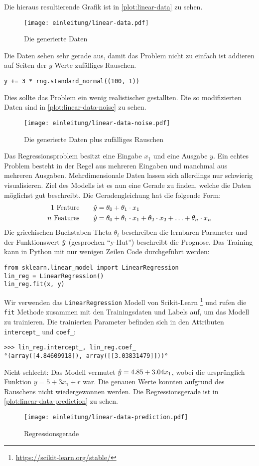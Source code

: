Die hieraus resultierende Grafik ist in \autoref{plot:linear-data} zu sehen.
\newpage
\begin{figure}
  \centering
  \texttt{[image: einleitung/linear-data.pdf]}
  \caption{Die generierte Daten}
  \label{plot:linear-data}
\end{figure}
\noindent
Die Daten sehen sehr gerade aus, damit das Problem nicht zu einfach ist
addieren auf Seiten der $y$ Werte zufälliges Rauschen.
\begin{lstlisting}
y += 3 * rng.standard_normal((100, 1))
\end{lstlisting}
Dies sollte das Problem ein wenig realistischer gestallten.
Die so modifizierten Daten sind in \autoref{plot:linear-data-noise} zu sehen.
\begin{figure}[h]
  \centering
  \texttt{[image: einleitung/linear-data-noise.pdf]}
  \caption{Die generierte Daten plus zufälliges Rauschen}
  \label{plot:linear-data-noise}
\end{figure}
Das Regressionsproblem besitzt eine Eingabe $x_1$ und eine Ausgabe $y$.
Ein echtes Problem besteht in der Regel aus mehreren Eingaben und manchmal
aus mehreren Ausgaben. Mehrdimensionale Daten lassen sich allerdings nur schwierig
visualisieren. Ziel des Modells ist es nun eine Gerade zu finden, welche die
Daten möglichst gut beschreibt. Die Geradengleichung hat die folgende Form:
\begin{align}
  \text{1 Feature}\qquad    & \hat{y} = \theta_0 + \theta_1 \cdot x_1   \\
  \text{$n$ Features}\qquad & \hat{y} = \theta_0 + \theta_1 \cdot x_1 +
  \theta_2 \cdot x_2 + \ldots + \theta_n \cdot x_n
\end{align}
Die griechischen Buchstaben Theta $\theta_i$ beschreiben die lernbaren Parameter und
der Funktionswert $\hat{y}$ (gesprochen \enquote{y-Hut}) beschreibt die Prognose.
Das Training kann in Python mit nur wenigen Zeilen Code durchgeführt werden:
\begin{lstlisting}
from sklearn.linear_model import LinearRegression
lin_reg = LinearRegression()
lin_reg.fit(x, y)
\end{lstlisting}
Wir verwenden das \lstinline{LinearRegression} Modell von Scikit-Learn
\footnote{\url{https://scikit-learn.org/stable/}} und rufen die \lstinline{fit}
Methode zusammen mit den Trainingsdaten und Labels auf, um das Modell zu trainieren.
Die trainierten Parameter befinden sich in den Attributen \lstinline{intercept_}
und \lstinline{coef_}:
\begin{lstlisting}
>>> lin_reg.intercept_, lin_reg.coef_
°(array([4.84609918]), array([[3.03831479]]))°
\end{lstlisting}
Nicht schlecht: Das Modell vermutet $\hat{y} = 4.85 + 3.04x_1$, wobei die ursprünglich
Funktion $y = 5 + 3x_1 + r$ war. Die genauen Werte konnten aufgrund des Rauschens
nicht wiedergewonnen werden. Die Regressionsgerade ist
in \autoref{plot:linear-data-prediction} zu sehen.
\begin{figure}[!h]
  \centering
  \texttt{[image: einleitung/linear-data-prediction.pdf]}
  \caption{Regressionsgerade}
  \label{plot:linear-data-prediction}
\end{figure}

